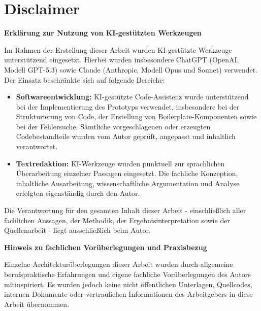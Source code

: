\section*{Disclaimer}

\textbf{Erklärung zur Nutzung von KI-gestützten Werkzeugen}

Im Rahmen der Erstellung dieser Arbeit wurden KI-gestützte Werkzeuge unterstützend eingesetzt.
Hierbei wurden insbesondere ChatGPT (OpenAI, Modell GPT-5.3) sowie Claude (Anthropic, Modell Opus und Sonnet) verwendet.
Der Einsatz beschränkte sich auf folgende Bereiche:

\begin{itemize}
    \item \textbf{Softwareentwicklung:} KI-gestützte Code-Assistenz wurde unterstützend bei
          der Implementierung des Prototyps verwendet, insbesondere bei der Strukturierung
          von Code, der Erstellung von Boilerplate-Komponenten sowie bei der Fehlersuche.
          Sämtliche vorgeschlagenen oder erzeugten Codebestandteile wurden vom Autor geprüft,
          angepasst und inhaltlich verantwortet.

    \item \textbf{Textredaktion:} KI-Werkzeuge wurden punktuell zur sprachlichen Überarbeitung
          einzelner Passagen eingesetzt. Die fachliche Konzeption, inhaltliche Ausarbeitung,
          wissenschaftliche Argumentation und Analyse erfolgten eigenständig durch den Autor.
\end{itemize}

Die Verantwortung für den gesamten Inhalt dieser Arbeit - einschließlich aller fachlichen
Aussagen, der Methodik, der Ergebnisinterpretation sowie der Quellenarbeit - liegt
ausschließlich beim Autor.

\vspace{12pt}
\textbf{Hinweis zu fachlichen Vorüberlegungen und Praxisbezug}

Einzelne Architekturüberlegungen dieser Arbeit wurden durch allgemeine berufspraktische
Erfahrungen und eigene fachliche Vorüberlegungen des Autors mitinspiriert. Es wurden
jedoch keine nicht öffentlichen Unterlagen, Quellcodes, internen Dokumente oder
vertraulichen Informationen des Arbeitgebers in diese Arbeit übernommen.

